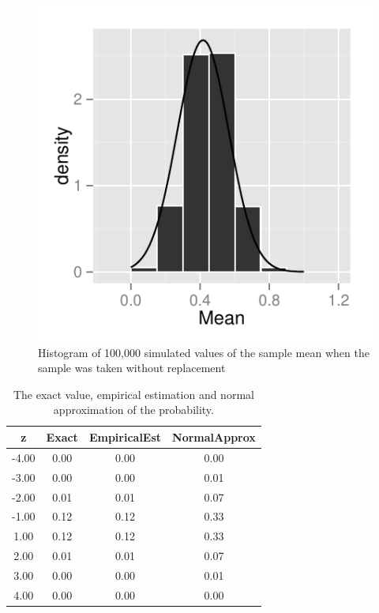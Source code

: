 \documentclass[11pt]{article}
\begin{document}
\begin{figure}
\centering
\includegraphics[scale=1]{histogram_1e-1.pdf}
\caption{Histogram of 100,000 simulated values of the sample mean when the sample was taken without replacement}
\end{figure}

\begin{table}[H]
\centering
\begin{tabular}{|c|ccc|}
  \hline
z & Exact & EmpiricalEst & NormalApprox \\ 
  \hline
-4.00 & 0.00 & 0.00 & 0.00 \\ 
  -3.00 & 0.00 & 0.00 & 0.01 \\ 
  -2.00 & 0.01 & 0.01 & 0.07 \\ 
  -1.00 & 0.12 & 0.12 & 0.33 \\ 
  1.00 & 0.12 & 0.12 & 0.33 \\ 
  2.00 & 0.01 & 0.01 & 0.07 \\ 
  3.00 & 0.00 & 0.00 & 0.01 \\ 
  4.00 & 0.00 & 0.00 & 0.00 \\ 
   \hline
\end{tabular}
\caption{The exact value, empirical estimation and normal approximation of the probability.} 
\end{table}
\end{document}
